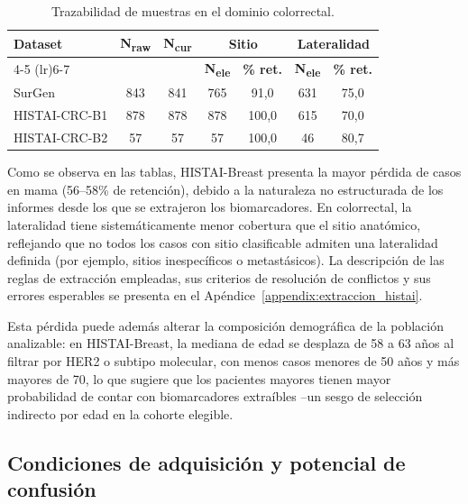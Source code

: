 \begin{table}[htbp]
\centering
\caption{Trazabilidad de muestras en el dominio colorrectal.}
\label{tab:trazabilidad_colorrectal}
\footnotesize
\setlength{\tabcolsep}{4pt}
\begin{tabular}{lcccccc}
\toprule
\multirow{2}{*}{\textbf{Dataset}} & \multirow{2}{*}{\textbf{N\textsubscript{raw}}} & \multirow{2}{*}{\textbf{N\textsubscript{cur}}}
  & \multicolumn{2}{c}{\textbf{Sitio}} & \multicolumn{2}{c}{\textbf{Lateralidad}} \\
\cmidrule(lr){4-5} \cmidrule(lr){6-7}
& & & \textbf{N\textsubscript{ele}} & \textbf{\% ret.} & \textbf{N\textsubscript{ele}} & \textbf{\% ret.} \\
\midrule
SurGen & 843 & 841 & 765 & 91,0 & 631 & 75,0 \\
HISTAI-CRC-B1 & 878 & 878 & 878 & 100,0 & 615 & 70,0 \\
HISTAI-CRC-B2 & 57 & 57 & 57 & 100,0 & 46 & 80,7 \\
\bottomrule
\end{tabular}
\end{table}

Como se observa en las tablas, HISTAI-Breast presenta la mayor pérdida de casos en mama (56--58\% de retención), debido a la naturaleza no estructurada de los informes desde los que se extrajeron los biomarcadores. En colorrectal, la lateralidad tiene sistemáticamente menor cobertura que el sitio anatómico, reflejando que no todos los casos con sitio clasificable admiten una lateralidad definida (por ejemplo, sitios inespecíficos o metastásicos). La descripción de las reglas de extracción empleadas, sus criterios de resolución de conflictos y sus errores esperables se presenta en el Apéndice~\ref{appendix:extraccion_histai}.

Esta pérdida puede además alterar la composición demográfica de la población analizable: en HISTAI-Breast, la mediana de edad se desplaza de 58 a 63 años al filtrar por HER2 o subtipo molecular, con menos casos menores de 50 años y más mayores de 70, lo que sugiere que los pacientes mayores tienen mayor probabilidad de contar con biomarcadores extraíbles --un sesgo de selección indirecto por edad en la cohorte elegible.

\subsection{Condiciones de adquisición y potencial de confusión}
\label{sec:adquisicion}

